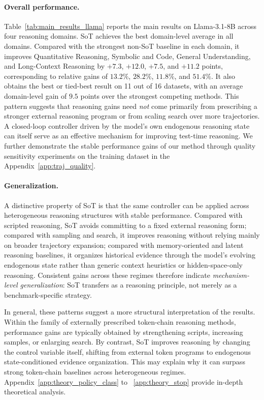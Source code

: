     \paragraph{Overall performance.}
    Table~\ref{tab:main_results_llama} reports the main results on Llama-3.1-8B across four reasoning domains.
    SoT achieves the best domain-level average in all domains. 
    Compared with the strongest non-SoT baseline in each domain, it improves Quantitative Reasoning, Symbolic and Code, General Understanding, and Long-Context Reasoning by \(+7.3\), \(+12.0\), \(+7.5\), and \(+11.2\) points, corresponding to relative gains of \(13.2\%\), \(28.2\%\), \(11.8\%\), and \(51.4\%\). 
    It also obtains the best or tied-best result on 11 out of 16 datasets, with an average domain-level gain of \(9.5\) points over the strongest competing methods.
    This pattern suggests that reasoning gains need \emph{not} come primarily from prescribing a stronger external reasoning program or from scaling search over more trajectories. 
    A closed-loop controller driven by the model's own endogenous reasoning state can itself serve as an effective mechanism for improving test-time reasoning.
    We further demonstrate the stable performance gains of our method through quality sensitivity experiments on the training dataset in the Appendix~\ref{app:traj_quality}.

    \vspace{-2mm}
    \paragraph{Generalization.}
    A distinctive property of SoT is that the same controller can be applied across heterogeneous reasoning structures with stable performance.
    Compared with scripted reasoning, SoT avoids committing to a fixed external reasoning form; compared with sampling and search, it improves reasoning without relying mainly on broader trajectory expansion; compared with memory-oriented and latent reasoning baselines, it organizes historical evidence through the model's evolving endogenous state rather than generic context heuristics or hidden-space-only reasoning.
    Consistent gains across these regimes therefore indicate \emph{mechanism-level generalization}: SoT transfers as a reasoning principle, not merely as a benchmark-specific strategy.

    In general, these patterns suggest a more structural interpretation of the results.
    Within the family of externally prescribed token-chain reasoning methods, performance gains are typically obtained by strengthening scripts, increasing samples, or enlarging search.
    By contrast, SoT improves reasoning by changing the control variable itself, shifting from external token programs to endogenous state-conditioned evidence organization. This may explain why it can surpass strong token-chain baselines across heterogeneous regimes.
    Appendix~\ref{app:theory_policy_class} to ~\ref{app:theory_stop} provide in-depth theoretical analysis.


